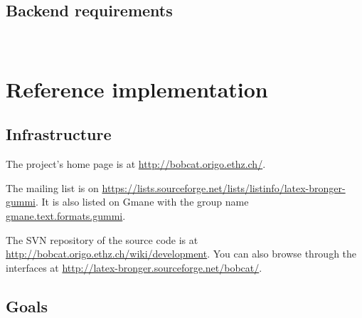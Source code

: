 \documentclass[12pt,openany]{book}
\begin{document}
~

\begin{attributes}
\end{attributes}


\begin{attributes}
\end{attributes}



~


~

\section{Backend requirements}

~


\chapter{Reference implementation}

\section{Infrastructure}

The project's home page is at \url{http://bobcat.origo.ethz.ch/}.

The mailing list is on
\url{https://lists.sourceforge.net/lists/listinfo/latex-bronger-gummi}.  It is
also listed on Gmane with the group name \url{gmane.text.formats.gummi}.

The SVN repository of the source code is at
\url{http://bobcat.origo.ethz.ch/wiki/development}.  You can also browse through
the interfaces at \url{http://latex-bronger.sourceforge.net/bobcat/}.


\section{Goals}
\end{document}
